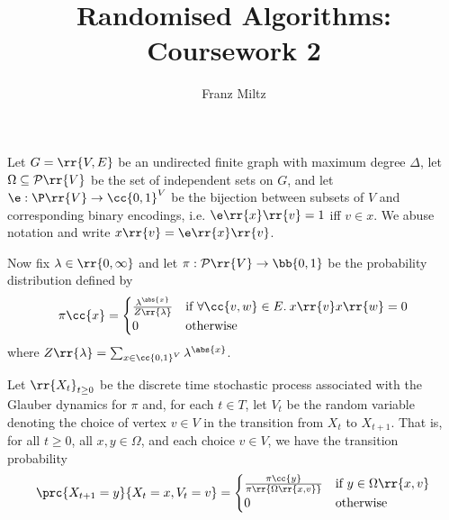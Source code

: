 \documentclass{article}
\title{Randomised Algorithms: Coursework 2}
\author{Franz Miltz}
\begin{document}
\maketitle

Let $G=\rr{V,E}$ be an undirected finite graph with maximum degree $\Delta$, let $\Omega\subseteq\mathcal P\rr{V}$
be the set of independent sets on $G$, and let $\e:\P\rr{V}\to \cc{0,1}^V$ be the bijection
between subsets of $V$ and corresponding binary encodings, i.e. $\e\rr{x}\rr{v}=1$ iff $v\in x$.
We abuse notation and write $x\rr{v}=\e\rr{x}\rr{v}$.

Now fix $\lambda\in\rr{0,\infty}$ and let $\pi:\mathcal P\rr{V}\to\bb{0,1}$ be the probability distribution defined by
\begin{align*}
  \pi\cc{x}=
  \begin{cases}
    \frac{\lambda^{\abs{x}}}{Z\rr{\lambda}} &\text{if }\forall \cc{v,w}\in E.\:x\rr{v}x\rr{w}=0 \\
    0 &\text{otherwise}
  \end{cases}
\end{align*}
where $Z\rr{\lambda}=\sum_{x\in\cc{0,1}^V} \lambda^{\abs{x}}$.

Let $\rr{X_t}_{t\geq 0}$ be the discrete time stochastic process associated with the Glauber dynamics
for $\pi$ and, for each $t\in T$, let $V_t$ be the random variable denoting the choice of
vertex $v\in V$ in the transition from $X_t$ to $X_{t+1}$. That is, for all $t\geq 0$, all $x,y\in\Omega$,
and each choice $v\in V$, we have the transition probability
\begin{align*}
  \prc{X_{t+1}=y}{X_t=x, V_t=v} =
  \begin{cases}
    \frac{\pi\cc{y}}{\pi\rr{\Omega\rr{x,v}}} &\text{if }y\in\Omega\rr{x,v} \\
    0 &\text{otherwise}
  \end{cases}
\end{align*}
\end{document}
